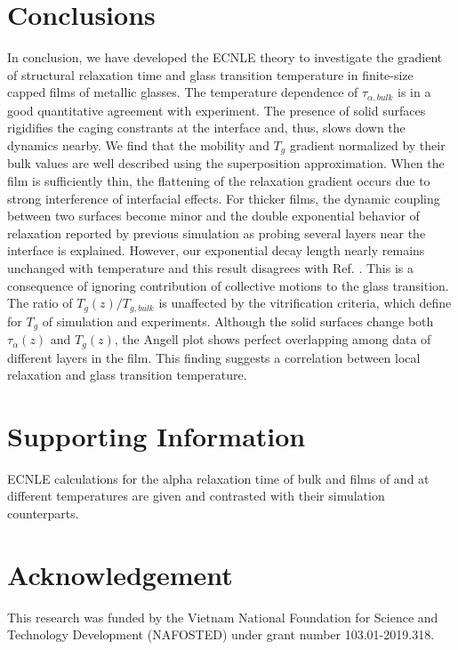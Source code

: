 \documentclass[twocolumn,preprintnumbers,amsmath,amssymb,superscriptaddress]{revtex4}
\begin{document}
\section{Conclusions}
In conclusion, we have developed the ECNLE theory to investigate the gradient of structural relaxation time and glass transition temperature in finite-size capped films of metallic glasses. The temperature dependence of $\tau_{\alpha,bulk}$ is in a good quantitative agreement with experiment. The presence of solid surfaces rigidifies the caging constrants at the interface and, thus, slows down the dynamics nearby. We find that the mobility and $T_g$ gradient normalized by their bulk values are well described using the superposition approximation. When the film is sufficiently thin, the flattening of the relaxation gradient occurs due to strong interference of interfacial effects. For thicker films, the dynamic coupling between two surfaces become minor and the double exponential behavior of relaxation reported by previous simulation \cite{14} as probing several layers near the interface is explained. However, our exponential decay length nearly remains unchanged with temperature and this result disagrees with Ref. \cite{14}. This is a consequence of ignoring contribution of collective motions to the glass transition. The ratio of $T_g(z)/T_{g,bulk}$ is unaffected by the vitrification criteria, which define for $T_g$ of simulation and experiments. Although the solid surfaces change both $\tau_\alpha(z)$ and $T_g(z)$, the Angell plot shows perfect overlapping among data of different layers in the film. This finding suggests a correlation between local relaxation and glass transition temperature.

\section*{Supporting Information}
ECNLE calculations for the alpha relaxation time of bulk and films of  and  at different temperatures are given and contrasted with their simulation counterparts.

\section*{Acknowledgement}
This research was funded by the Vietnam National Foundation for Science and Technology Development (NAFOSTED) under grant number 103.01-2019.318. 
\end{document}
